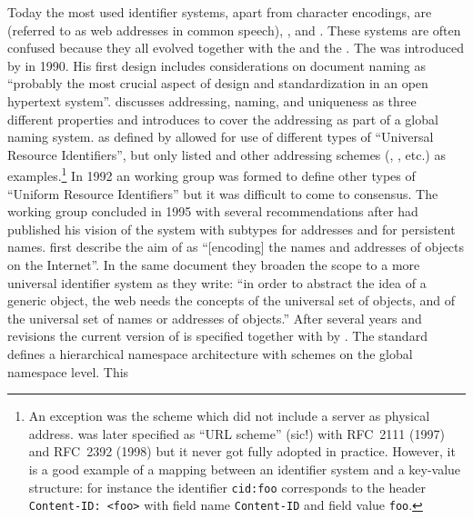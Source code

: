 Today the most used identifier systems, apart from character encodings, are
 (referred to as web addresses in common
speech), , and . These systems are often confused because they all evolved together 
with the  and the . The  was introduced by  
in 1990. His first design includes considerations on document naming as 
``probably the most crucial aspect of design and standardization in an open 
hypertext system''. \textcite{BernersLee1991} discusses
addressing, naming, and uniqueness as three different properties and 
introduces  to cover the addressing as part of a global naming system. 
 as defined by
\textcite{BernersLee1992} allowed for use of different types of ``Universal Resource 
Identifiers'', but only listed  and other addressing schemes (,
, etc.) as examples.\footnote{An exception was the 
 scheme which did not include a server as 
physical address.  was later specified as 
``URL scheme'' (sic!) with RFC~2111 (1997) and RFC~2392 (1998) but it never
got fully adopted in practice. However, it is a good example of a mapping
between an identifier system and a key-value structure: for instance the identifier 
\texttt{cid:foo} corresponds to the  header 
\texttt{Content-ID: <foo>} with field name \texttt{Content-ID} and 
field value \texttt{foo}.} In 1992 an  working group was formed to
define other types of ``Uniform Resource Identifiers'' \cite{Emtage1992}
but it was difficult to come to consensus. The working group concluded in 1995 
with several recommendations after \textcite{BernersLee1994a} had published 
his vision of the  system with subtypes  for addresses and 
 for persistent names. \textcite{BernersLee1994} first describe the aim of
 as ``[encoding] the names and addresses of objects on the Internet''.
In the same document they broaden the scope to a more universal identifier 
system as they write: ``in order to abstract the idea of a generic object, the 
web needs the concepts of the universal set of objects, and of the universal 
set of names or addresses of objects.'' After several years and revisions the 
current version of  is specified together with  by
\textcite{BernersLee2005}. The standard defines a hierarchical namespace 
architecture with  schemes on the global namespace level. This
